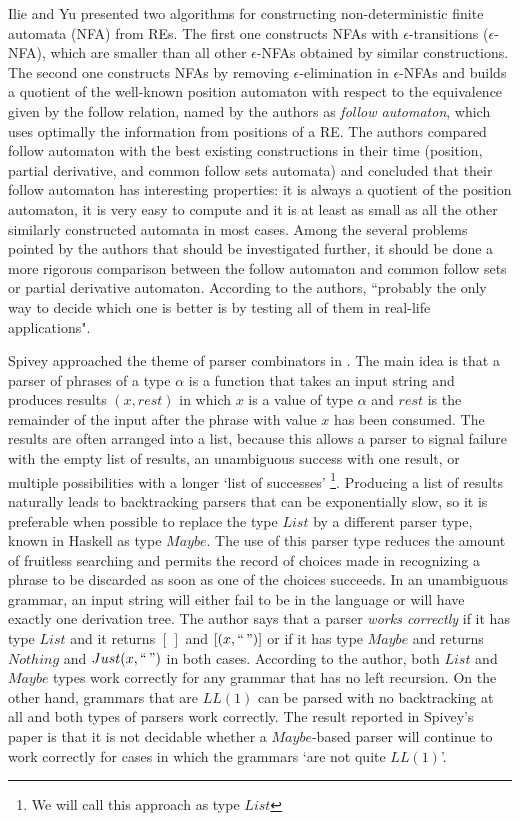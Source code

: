 \documentclass[oneside,12pt]{scrbook}
\theoremstyle{definition}
\theoremstyle{plain}
\theoremstyle{definition}
\begin{document}
Ilie and Yu \cite{Ilie2003} presented two algorithms for constructing non-deterministic finite automata (NFA) from REs. The first one constructs NFAs with $\epsilon$-transitions ($\epsilon$-NFA), which are smaller than all other $\epsilon$-NFAs obtained by similar constructions. The second one constructs NFAs by removing $\epsilon$-elimination in $\epsilon$-NFAs and builds a quotient of the well-known position automaton with respect to the equivalence given by the follow relation, named by the authors as \textit{follow automaton}, which uses optimally the information from positions of a RE. The authors compared follow automaton with the best existing constructions in their time (position, partial derivative, and common follow sets automata) and concluded that their follow automaton has interesting properties: it is always a quotient of the position automaton, it is very easy to compute and it is at least as small as all the other similarly constructed automata in most cases. Among the several problems pointed by the authors that should be investigated further, it should be done a more rigorous comparison between the follow automaton and common follow sets or partial derivative automaton. According to the authors, ``probably the only way to decide which one is better is by testing all of them in real-life applications".


Spivey approached the theme of parser combinators in \cite{Spivey2012}. The main idea is that a parser of phrases of a type $\alpha$ is a function that takes an input string and produces results $(x,rest)$ in which $x$ is a value of type $\alpha$ and $rest$ is the remainder of the input after the phrase with value $x$ has been consumed. The results are often arranged into a list, because this allows a
parser to signal failure with the empty list of results, an unambiguous success with one result, or multiple possibilities with a longer ‘list of successes’ \footnote{We will call this approach as type $List$}. Producing a list of results naturally leads to backtracking parsers that can be exponentially slow, so it is preferable when possible to replace the type $List$ by a different parser type, known in Haskell as type $Maybe$. The use of this parser type reduces the amount of fruitless searching and permits the record of choices made in recognizing a phrase to be discarded as soon as one of the choices succeeds. In an unambiguous grammar, an input string will either fail to be in the language or will have exactly one derivation tree. The author says that a parser \textit{works correctly} if it has type $List$ and it returns $[\,]$ and $[(x, ``\,")]$ or if it has type $Maybe$ and returns $Nothing$ and $Just (x, ``\,")$ in both cases. According to the author, both $List$ and $Maybe$ types work correctly for any grammar that has no left recursion. On the other hand, grammars that are $LL(1)$ can be parsed with no backtracking at all and both types of parsers work correctly. The result reported in Spivey's paper is that it is not decidable whether a $Maybe$-based parser will continue to work correctly for cases in which the grammars `are not quite $LL(1)$'.
\end{document}
